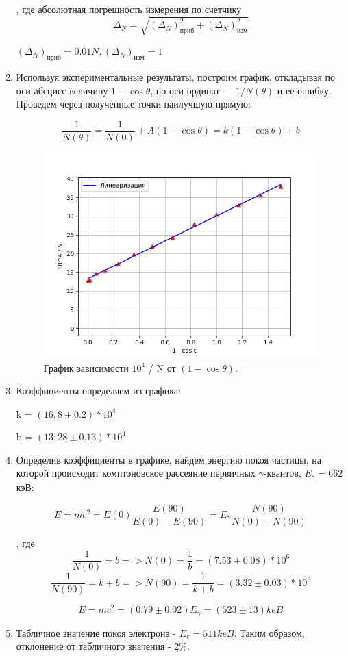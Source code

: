 \documentclass[a4paper,12pt]{article}
\begin{document}
\begin{enumerate}
, где абсолютная погрешность измерения по счетчику
\[ \Delta_N = \sqrt{(\Delta_N)_{\text{приб}}^2 + (\Delta_N)_{\text{изм}}^2} \]


$(\Delta_N)_{\text{приб}} = 0.01N, (\Delta_N)_{\text{изм}} = 1$

\item 	Используя экспериментальные результаты, построим график, откладывая по оси абсцисс величину $1 - \cos\theta$, по оси ординат --- $1 / N(\theta)$ и ее ошибку. Проведем через полученные точки наилучшую прямую:

	\[	\frac{1}{N(\theta)} = \frac{1}{N(0)} + A(1 - \cos\theta) = k (1 - \cos\theta) + b\]
	

		    \begin{figure}[H]
  \begin{center}
    \includegraphics[width=15cm]{gra1.png}
    \caption{График зависимости $10^4$ / N от $(1 - \cos\theta)$.}
    \label{fig:}
  \end{center}
\end{figure}

\item Коэффициенты определяем из графика:

k = $(16,8\pm0.2) * 10^4$


b = $(13,28\pm0.13) * 10^4$


\item Определив коэффициенты в графике, найдем энергию покоя частицы, на которой происходит комптоновское рассеяние первичных $\gamma$-квантов, $E_\gamma = 662$кэВ:

\[E = mc^2 = E(0)\frac{E(90)}{E(0) - E(90)} = E_\gamma \frac{N(90)}{N(0) - N(90)}\]

, где 
\[ \frac{1}{N(0)} = b => N(0) = \frac{1}{b} = (7.53 \pm 0.08)* 10^6\]
\[ \frac{1}{N(90)} = k + b => N(90) = \frac{1}{k + b} = (3.32 \pm 0.03)* 10^6\]

\[E = mc^2 = (0.79 \pm 0.02) E_\gamma = (523 \pm 13)keB\]
		
\item Табличное значение покоя электрона - $E_e = 511 keB$. Таким образом, отклонение от табличного значения - 2\%.
	\end{enumerate}
\end{document}
